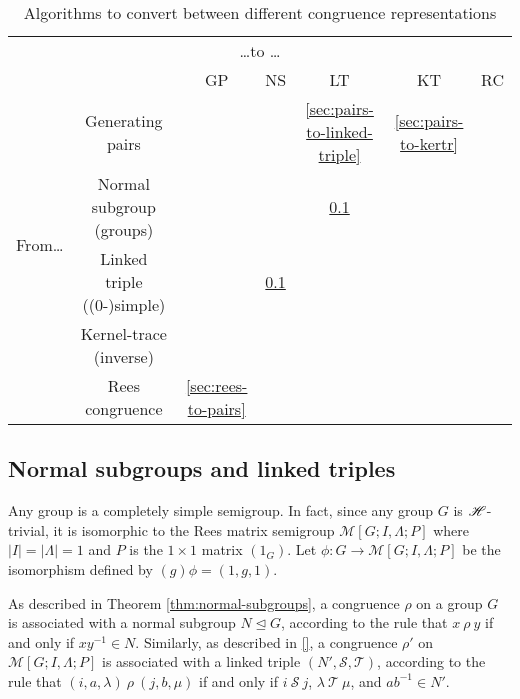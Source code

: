 \begin{table}[h]
  \centering
  \renewcommand{\arraystretch}{1.3}
  \begin{tabular}{ c | c | c | c | c | c | c |}
    \multicolumn{7}{c}{\qquad\qquad\qquad\qquad\qquad\qquad\qquad\qquad\qquad \ldots to \ldots} \\
    \cline{2-7}
    \multirow{7}{*}{From\ldots} &  & GP & NS & LT & KT & RC \\
    \cline{2-7}
    & Generating pairs & \cellcolor{gray} &  & \ref{sec:pairs-to-linked-triple} & \ref{sec:pairs-to-kertr} & \\
    \cline{2-7}
    & Normal subgroup (groups) &  & \cellcolor{gray} & \ref{sec:normal-subgroup-to-linked-triple} &  & \\
    \cline{2-7}
    & Linked triple ((0-)simple) &  & \ref{sec:normal-subgroup-to-linked-triple} & \cellcolor{gray} & &\\
    \cline{2-7}
    & Kernel-trace (inverse) &  &  &  & \cellcolor{gray} &\\
    \cline{2-7}
    & Rees congruence & \ref{sec:rees-to-pairs} &  &  &  & \cellcolor{gray}\\
    \cline{2-7}
  \end{tabular}
  \renewcommand{\arraystretch}{0.7}
  \caption{Algorithms to convert between different congruence representations}
  \label{tab:converting}
\end{table}

\subsection{Normal subgroups and linked triples}
\label{sec:normal-subgroup-to-linked-triple}
Any group is a completely simple semigroup.  In fact, since any group $G$ is
$\mathrel{\mathscr{H}}$-trivial, it is isomorphic to the Rees matrix semigroup
$\mathcal{M}[G; I, \Lambda; P]$ where $|I|=|\Lambda|={1}$ and $P$ is the
$1 \times 1$ matrix $(1_G)$.  Let $\phi: G \to \mathcal{M}[G; I, \Lambda; P]$ be
the isomorphism defined by $(g)\phi = (1, g, 1)$.

As described in Theorem \ref{thm:normal-subgroups}, a congruence $\rho$ on a
group $G$ is associated with a normal subgroup $N \trianglelefteq G$, according
to the rule that $x ~\rho~ y$ if and only if $xy^{-1} \in N$.  Similarly, as
described in \ref{}, a congruence $\rho'$ on $\mathcal{M}[G; I, \Lambda; P]$ is
associated with a linked triple $(N', \mathcal{S}, \mathcal{T})$, according to
the rule that $(i, a, \lambda) ~\rho~ (j, b, \mu)$ if and only if
$i ~\mathcal{S}~ j$, $\lambda ~\mathcal{T}~ \mu$, and $ab^{-1} \in N'$.

